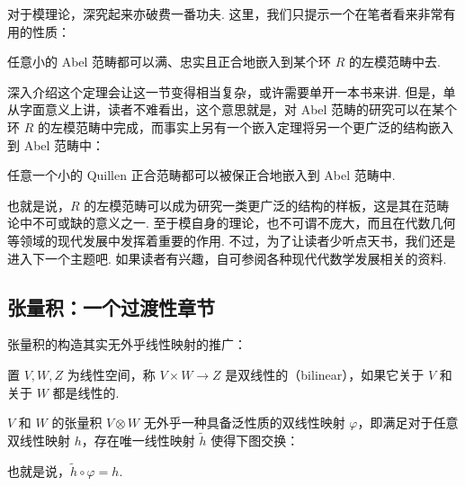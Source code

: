 对于模理论，深究起来亦破费一番功夫. 这里，我们只提示一个在笔者看来非常有用的性质：

\begin{theorem}
    任意小的 Abel 范畴都可以满、忠实且正合地嵌入到某个环 $R$ 的左模范畴中去.
\end{theorem}

深入介绍这个定理会让这一节变得相当复杂，或许需要单开一本书来讲. 但是，单从字面意义上讲，读者不难看出，这个意思就是，对 Abel 范畴的研究可以在某个环 $R$ 的左模范畴中完成，而事实上另有一个嵌入定理将另一个更广泛的结构嵌入到 Abel 范畴中：

\begin{theorem}
    任意一个小的 Quillen 正合范畴都可以被保正合地嵌入到 Abel 范畴中.
\end{theorem}

也就是说，$R$ 的左模范畴可以成为研究一类更广泛的结构的样板，这是其在范畴论中不可或缺的意义之一. 至于模自身的理论，也不可谓不庞大，而且在代数几何等领域的现代发展中发挥着重要的作用. 不过，为了让读者少听点天书，我们还是进入下一个主题吧. 如果读者有兴趣，自可参阅各种现代代数学发展相关的资料.

\subsection{张量积：一个过渡性章节}

张量积的构造其实无外乎线性映射的推广：

\begin{definition}
    置 $V, W, Z$ 为线性空间，称 $V \times W \to Z$ 是双线性的（bilinear），如果它关于 $V$ 和关于 $W$ 都是线性的.
\end{definition}

\begin{definition} \label{thm:16:tensorprod}
    $V$ 和 $W$ 的张量积 $V \otimes W$ 无外乎一种具备泛性质的双线性映射 $\varphi$，即满足对于任意双线性映射 $h$，存在唯一线性映射 $\widetilde h$ 使得下图交换：

    \begin{center}
    \end{center}

    也就是说，$\widetilde h \circ \varphi = h$.
\end{definition}

